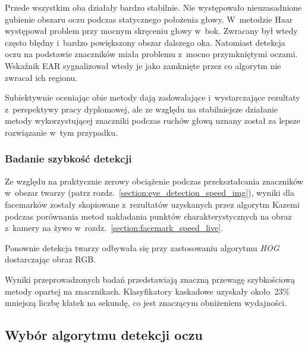 \vspace{4mm}

Przede wszystkim oba działały bardzo stabilnie. Nie występowało nieuzasadnione gubienie obszaru oczu podczas statycznego położenia głowy. W~metodzie Haar występował problem przy mocnym skręceniu głowy w~bok. Zwracany był wtedy często błędny i~bardzo powiększony obszar dalszego oka. Natomiast detekcja oczu na podstawie znaczników miała problemu z~mocno przymkniętymi oczami. Wskaźnik EAR sygnalizował wtedy je jako zamknięte przez co algorytm nie zwracał ich regionu.

\par

Subiektywnie oceniając obie metody dają zadowalające i~wystarczające rezultaty z~perspektywy pracy dyplomowej, ale ze względu na stabilniejsze działanie metody wykorzystującej znaczniki podczas ruchów głową uznany został za lepsze rozwiązanie w~tym przypadku.


\subsubsection{Badanie szybkość detekcji} \label{section:eye_speed_live}

Ze względu na praktycznie zerowy obciążenie podczas przekształcania znaczników w~obszar twarzy (patrz rozdz.~\hyperref[{section:eye_detection_speed_img}]{\ref{section:eye_detection_speed_img}}), wyniki dla facemarków zostały skopiowane z~rezultatów uzyskanych przez algorytm Kazemi podczas porównania metod nakładania punktów charakterystycznych na obraz z~kamery na żywo w~rozdz.~\hyperref[{section:facemark_speed_live}]{\ref{section:facemark_speed_live}}.

\par

Ponownie detekcja twarzy odbywała się przy zastosowaniu algorytmu \textit{HOG} dostarczając obraz RGB.



Wyniki przeprowadzonych badań przedstawiają znaczną przewagę szybkościową metody opartej na znacznikach. Klasyfikatory kaskadowe uzyskały około~$23\%$ mniejszą liczbę klatek na sekundę, co jest znaczącym obniżeniem wydajności.



\subsection{Wybór algorytmu detekcji oczu}

